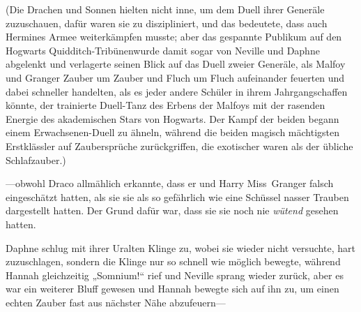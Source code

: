 (Die Drachen und Sonnen hielten nicht inne, um dem Duell ihrer Generäle zuzuschauen, dafür waren sie zu diszipliniert, und das bedeutete, dass auch Hermines Armee weiterkämpfen musste; aber das gespannte Publikum auf den Hogwarts Quidditch-Tribünenwurde damit sogar von Neville und Daphne abgelenkt und verlagerte seinen Blick auf das Duell zweier Generäle, als Malfoy und Granger Zauber um Zauber und Fluch um Fluch aufeinander feuerten und dabei schneller handelten, als es jeder andere Schüler in ihrem Jahrgangschaffen könnte, der trainierte Duell-Tanz des Erbens der Malfoys mit der rasenden Energie des akademischen Stars von Hogwarts. Der Kampf der beiden begann einem Erwachsenen-Duell zu ähneln, während die beiden magisch mächtigsten Erstklässler auf Zaubersprüche zurückgriffen, die exotischer waren als der übliche Schlafzauber.)

—obwohl Draco allmählich erkannte, dass er und Harry Miss~Granger falsch eingeschätzt hatten, als sie sie als so gefährlich wie eine Schüssel nasser Trauben dargestellt hatten. Der Grund dafür war, dass sie sie noch nie \emph{wütend} gesehen hatten.

\later

Daphne schlug mit ihrer Uralten Klinge zu, wobei sie wieder nicht versuchte, hart zuzuschlagen, sondern die Klinge nur so schnell wie möglich bewegte, während Hannah gleichzeitig „Somnium!“ rief und Neville sprang wieder zurück, aber es war ein weiterer Bluff gewesen und Hannah bewegte sich auf ihn zu, um einen echten Zauber fast aus nächster Nähe abzufeuern—

